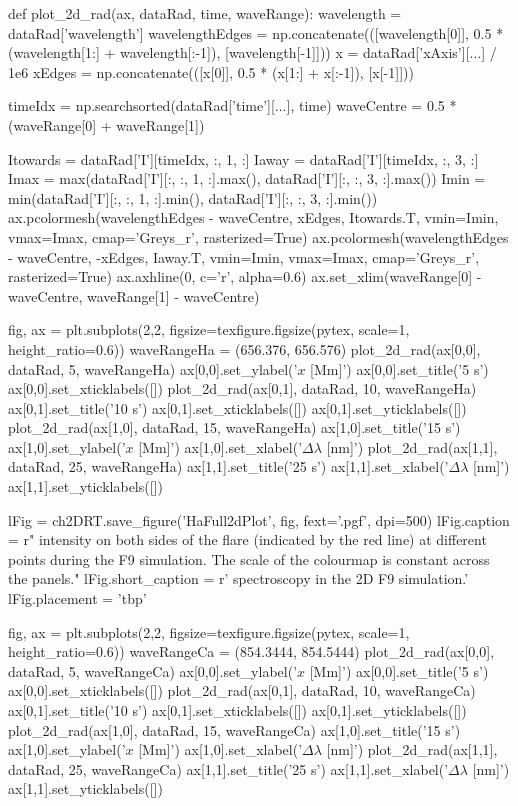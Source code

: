 \begin{pycode}[2DRT]
def plot_2d_rad(ax, dataRad, time, waveRange):
    wavelength = dataRad['wavelength']
    wavelengthEdges = np.concatenate(([wavelength[0]], 0.5 * (wavelength[1:] + wavelength[:-1]), [wavelength[-1]]))
    x = dataRad['xAxis'][...] / 1e6
    xEdges = np.concatenate(([x[0]], 0.5 * (x[1:] + x[:-1]), [x[-1]]))

    timeIdx = np.searchsorted(dataRad['time'][...], time)
    waveCentre = 0.5 * (waveRange[0] + waveRange[1])

    Itowards = dataRad['I'][timeIdx, :, 1, :]
    Iaway = dataRad['I'][timeIdx, :, 3, :]
    Imax = max(dataRad['I'][:, :, 1, :].max(), dataRad['I'][:, :, 3, :].max())
    Imin = min(dataRad['I'][:, :, 1, :].min(), dataRad['I'][:, :, 3, :].min())
    ax.pcolormesh(wavelengthEdges - waveCentre, xEdges, Itowards.T, vmin=Imin, vmax=Imax, cmap='Greys_r', rasterized=True)
    ax.pcolormesh(wavelengthEdges - waveCentre, -xEdges, Iaway.T, vmin=Imin, vmax=Imax, cmap='Greys_r', rasterized=True)
    ax.axhline(0, c='r', alpha=0.6)
    ax.set_xlim(waveRange[0] - waveCentre, waveRange[1] - waveCentre)

fig, ax = plt.subplots(2,2, figsize=texfigure.figsize(pytex, scale=1, height_ratio=0.6))
waveRangeHa = (656.376, 656.576)
plot_2d_rad(ax[0,0], dataRad, 5, waveRangeHa)
ax[0,0].set_ylabel('$x$ [Mm]')
ax[0,0].set_title('5 s')
ax[0,0].set_xticklabels([])
plot_2d_rad(ax[0,1], dataRad, 10, waveRangeHa)
ax[0,1].set_title('10 s')
ax[0,1].set_xticklabels([])
ax[0,1].set_yticklabels([])
plot_2d_rad(ax[1,0], dataRad, 15, waveRangeHa)
ax[1,0].set_title('15 s')
ax[1,0].set_ylabel('$x$ [Mm]')
ax[1,0].set_xlabel('$\Delta\lambda$ [nm]')
plot_2d_rad(ax[1,1], dataRad, 25, waveRangeHa)
ax[1,1].set_title('25 s')
ax[1,1].set_xlabel('$\Delta\lambda$ [nm]')
ax[1,1].set_yticklabels([])

lFig = ch2DRT.save_figure('HaFull2dPlot', fig, fext='.pgf', dpi=500)
lFig.caption = r"\Ha{} intensity on both sides of the flare (indicated by the red line) at different points during the F9 simulation. The scale of the colourmap is constant across the panels."
lFig.short_caption = r'\Ha{} spectroscopy in the 2D F9 simulation.'
lFig.placement = 'tbp'

fig, ax = plt.subplots(2,2, figsize=texfigure.figsize(pytex, scale=1, height_ratio=0.6))
waveRangeCa = (854.3444, 854.5444)
plot_2d_rad(ax[0,0], dataRad, 5, waveRangeCa)
ax[0,0].set_ylabel('$x$ [Mm]')
ax[0,0].set_title('5 s')
ax[0,0].set_xticklabels([])
plot_2d_rad(ax[0,1], dataRad, 10, waveRangeCa)
ax[0,1].set_title('10 s')
ax[0,1].set_xticklabels([])
ax[0,1].set_yticklabels([])
plot_2d_rad(ax[1,0], dataRad, 15, waveRangeCa)
ax[1,0].set_title('15 s')
ax[1,0].set_ylabel('$x$ [Mm]')
ax[1,0].set_xlabel('$\Delta\lambda$ [nm]')
plot_2d_rad(ax[1,1], dataRad, 25, waveRangeCa)
ax[1,1].set_title('25 s')
ax[1,1].set_xlabel('$\Delta\lambda$ [nm]')
ax[1,1].set_yticklabels([])


\end{pycode}
